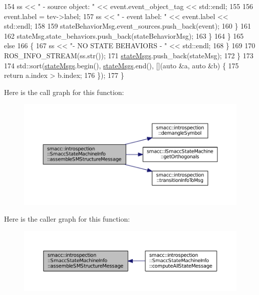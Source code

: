 \begin{DoxyCode}
154                     ss << \textcolor{stringliteral}{"                 - source object: "} << \textcolor{keyword}{event}.event\_object\_tag << std::endl;
155 
156                     \textcolor{keyword}{event}.label = tev->label;
157                     ss << \textcolor{stringliteral}{"                 - event label: "} << \textcolor{keyword}{event}.label << std::endl;
158 
159                     stateBehaviorMsg.event\_sources.push\_back(event);
160                 \}
161 
162                 stateMsg.state\_behaviors.push\_back(stateBehaviorMsg);
163             \}
164         \}
165         \textcolor{keywordflow}{else}
166         \{
167             ss << \textcolor{stringliteral}{"- NO STATE BEHAVIORS - "} << std::endl;
168         \}
169 
170         ROS\_INFO\_STREAM(ss.str());
171         \hyperlink{classsmacc_1_1introspection_1_1SmaccStateMachineInfo_a48e3ff7bbe2673d23e6942234446ebee}{stateMsgs}.push\_back(stateMsg);
172     \}
173 
174     std::sort(\hyperlink{classsmacc_1_1introspection_1_1SmaccStateMachineInfo_a48e3ff7bbe2673d23e6942234446ebee}{stateMsgs}.begin(), \hyperlink{classsmacc_1_1introspection_1_1SmaccStateMachineInfo_a48e3ff7bbe2673d23e6942234446ebee}{stateMsgs}.end(), [](\textcolor{keyword}{auto} &a, \textcolor{keyword}{auto} &b) \{
175         \textcolor{keywordflow}{return} a.index > b.index;
176     \});
177 \}
\end{DoxyCode}


Here is the call graph for this function\+:
\nopagebreak
\begin{figure}[H]
\begin{center}
\leavevmode
\includegraphics[width=350pt]{classsmacc_1_1introspection_1_1SmaccStateMachineInfo_a6758065a8d1faaa7c3688cf0dffe9334_cgraph}
\end{center}
\end{figure}




Here is the caller graph for this function\+:
\nopagebreak
\begin{figure}[H]
\begin{center}
\leavevmode
\includegraphics[width=350pt]{classsmacc_1_1introspection_1_1SmaccStateMachineInfo_a6758065a8d1faaa7c3688cf0dffe9334_icgraph}
\end{center}
\end{figure}


